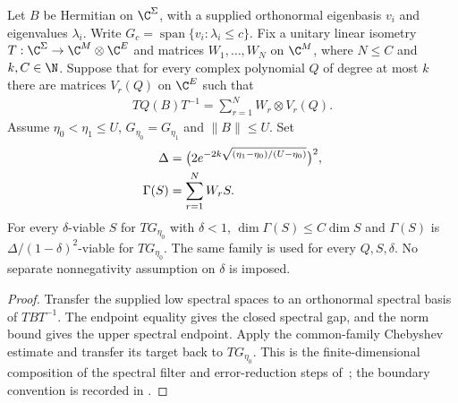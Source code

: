 \begin{theorem}
    \label{thm:actual_cluster_polynomial_viability}
    \leanok
    Let $B$ be Hermitian on $\C^\Sigma$, with a supplied orthonormal
    eigenbasis $v_i$ and eigenvalues $\lambda_i$. Write
    $G_c=\operatorname{span}\{v_i:\lambda_i\le c\}$.
    Fix a unitary linear isometry $T:\C^\Sigma\to\C^M\otimes\C^E$ and
    matrices $W_1,\ldots,W_N$ on $\C^M$, where $N\le C$ and $k,C\in\N$.
    Suppose that for every complex polynomial $Q$ of degree at most $k$
    there are matrices $V_r(Q)$ on $\C^E$ such that
    \begin{align}
        TQ(B)T^{-1}=\sum_{r=1}^N W_r\otimes V_r(Q).
    \end{align}
    Assume $\eta_0<\eta_1\le U$, $G_{\eta_0}=G_{\eta_1}$ and $\|B\|\le U$.
    Set
    \begin{align}
        \Delta    & =\bigl(2e^{-2k\sqrt{(\eta_1-\eta_0)/(U-\eta_0)}}\bigr)^2,\notag \\
        \Gamma(S) & =\sum_{r=1}^N W_rS.
    \end{align}
    For every $\delta$-viable $S$ for $TG_{\eta_0}$ with $\delta<1$,
    $\dim\Gamma(S)\le C\dim S$ and $\Gamma(S)$ is
    $\Delta/(1-\delta)^2$-viable for $TG_{\eta_0}$.
    The same family is used for every $Q,S,\delta$. No separate
    nonnegativity assumption on $\delta$ is imposed.
\end{theorem}
\begin{proof}\leanok
    Transfer the supplied low spectral spaces to an orthonormal spectral
    basis of $TBT^{-1}$. The endpoint equality gives the closed spectral gap, and
    the norm bound gives the upper spectral endpoint. Apply the common-family
    Chebyshev estimate and transfer its target back to $TG_{\eta_0}$.
    This is the finite-dimensional composition of the spectral filter and
    error-reduction steps of~\cite[Theorem 4.2 and Lemma 2.9]{Arad2016RigorousRG};
    the boundary convention is recorded in
    \cite{gap:alvv16_spectral_projector_boundary}.
\end{proof}

